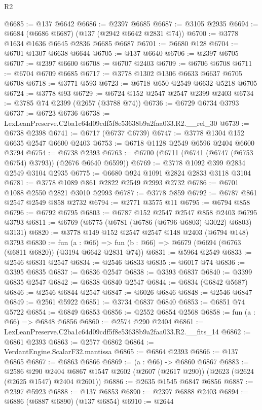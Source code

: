 \begin{lexlean}{R2}
\begin{coremodule}
@6685 := @137 @6642
@6686 := @2397 @6685
@6687 := @3105 @2935
@6694 := @6684 (@6686 @6687) (@137 (@2942 @6642 @2831 @74))
@6700 := @3778 @1634 @1636 @6645 @2836 @6685 @6687
@6701 := @6680 @128
@6704 := @6701 @1307 @6638 @6644
@6705 := @137 @6640
@6706 := @2397 @6705
@6707 := @2397 @6600
@6708 := @6707 @2403
@6709 := @6706 @6708
@6711 := @6704 @6709 @6685
@6717 := @3778 @1302 @1306 @6633 @6637 @6705 @6708
@6718 := @3771 @593
@6723 := @6718 @650 @2549 @6632 @5218 @6705
@6724 := @3778 @93
@6729 := @6724 @152 @2547 @2547 @2399 @2403
@6734 := @3785 @74 @2399 (@2657 (@3788 @74))
@6736 := @6729 @6734 @3793
@6737 := @6723 @6736
@6738 := LexLeanPreserve.C2ba1c64d09cdf5f8e53638b9a2faa033.R2.__rel_30
@6739 := @6738 @2398
@6741 := @6717 (@6737 @6739)
@6747 := @3778 @1304 @152 @6635 @2547 @6600 @2403
@6753 := @6718 @1128 @2549 @6596 @2404 @6600 @3794
@6754 := @6738 @2393
@6763 := @6700 (@6711 (@6741 (@6747 (@6753 @6754) @3793)) (@2676 @6640 @6599))
@6769 := @3778 @1092 @399 @2834 @2549 @3104 @2935
@6775 := @6680 @924 @1091 @2824 @2833 @3118 @3104
@6781 := @3778 @1089 @861 @2822 @2549 @2993 @2732
@6786 := @6701 @1088 @2550 @2821 @3010 @2993
@6787 := @3778 @859
@6792 := @6787 @861 @2547 @2549 @858 @2732
@6794 := @2771 @3575 @11
@6795 := @6794 @858
@6796 := @6792 @6795
@6803 := @6787 @152 @2547 @2547 @858 @2403 @6795 @3793
@6811 := @6769 (@6775 (@6781 (@6786 (@6796 @6803) @3022) @6803) @3131)
@6820 := @3778 @149 @152 @2547 @2547 @148 @2403 (@6794 @148) @3793
@6830 := fun (a : @66) =>
  fun (b : @66) => @6679 (@6694 (@6763 (@6811 @6820)) (@3194 @6642 @2831 @74))
@6831 := @5964 @2549
@6833 := @2546 @6831 @2547
@6834 := @2546 @6833
@6835 := @6017 @74
@6836 := @3395 @6835
@6837 := @6836 @2547
@6838 := @3393 @6837
@6840 := @3399 @6835 @2547
@6842 := @6838 @6840 @2547
@6844 := @6834 (@6842 @5687)
@6846 := @2546 @6844 @2547
@6847 := @6026 @6846
@6848 := @2546 @6847
@6849 := @2561 @5922
@6851 := @3734 @6837 @6840
@6853 := @6851 @74 @5722
@6854 := @6849 @6853
@6856 := @2552 @6854 @2568
@6858 := fun (a : @66) => @6848 @6856
@6860 := @2574 @290 @2404
@6861 := LexLeanPreserve.C2ba1c64d09cdf5f8e53638b9a2faa033.R2.__fits_14
@6862 := @6861 @2393
@6863 := @2577 @6862
@6864 := VerdantEngine.ScalarF32.mantissa
@6865 := @6864 @2393
@6866 := @137 @6865
@6867 := @6863 @6866
@6869 := (a : @66) -> @6860 @6867
@6883 := @2586
    @290
    @2404
    @6867
    @1547
    @2602
    (@2607 (@2617 @290))
    (@2623 (@2624 (@2625 @1547) @2404 @2601))
@6886 := @2635 @1545 @6847 @6856
@6887 := @2397 @5923
@6888 := @137 @6853
@6890 := @2397 @6888 @2403
@6894 := @6886 (@6887 @6890) (@137 @6854)
@6910 := @2644

\end{coremodule}
\end{lexlean}
